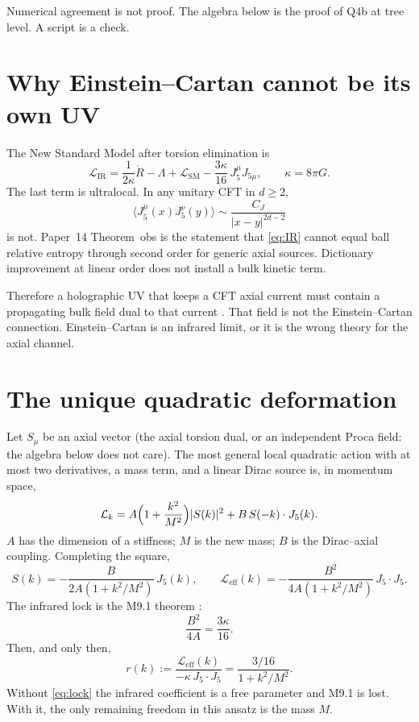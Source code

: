 \documentclass[11pt]{article}
\theoremstyle{definition}
\begin{document}
Numerical agreement is not proof. The algebra below is the proof
of Q4b at tree level. A script is a check.

\section{Why Einstein--Cartan cannot be its own UV}

The New Standard Model after torsion elimination is
\cite{HehlDatta1971,McGwierIII}
\begin{equation}
\mathcal{L}_{\mathrm{IR}}
=
\frac{1}{2\kappa}\mathring{R}
-\Lambda
+\mathcal{L}_{\mathrm{SM}}
-\frac{3\kappa}{16}\,J_5^\mu J_{5\mu},
\qquad
\kappa=8\pi G.
\label{eq:IR}
\end{equation}
The last term is ultralocal. In any unitary CFT in $d\ge 2$,
\begin{equation}
\langle J_5^\mu(x)J_5^\nu(y)\rangle
\sim
\frac{C_J}{\lvert x-y\rvert^{2d-2}}
\label{eq:JJ}
\end{equation}
is not. Paper~14 Theorem~obs is the statement that
\eqref{eq:IR} cannot equal ball relative entropy through second
order for generic axial sources. Dictionary improvement at linear
order \cite{McGwierVI} does not install a bulk kinetic term.

Therefore a holographic UV that keeps a CFT axial current must
contain a propagating bulk field dual to that current
\cite{Witten1998}. That field is not the Einstein--Cartan
connection. Einstein--Cartan is an infrared limit, or it is the
wrong theory for the axial channel.

\section{The unique quadratic deformation}

Let $S_\mu$ be an axial vector (the axial torsion dual, or an
independent Proca field: the algebra below does not care). The
most general local quadratic action with at most two derivatives,
a mass term, and a linear Dirac source is, in momentum space,
\begin{equation}
\mathcal{L}_k
=
A\Bigl(1+\frac{k^2}{M^2}\Bigr)\lvert S(k)\rvert^2
+
B\,S(-k)\cdot J_5(k).
\label{eq:UV}
\end{equation}
$A$ has the dimension of a stiffness; $M$ is the new mass;
$B$ is the Dirac--axial coupling. Completing the square,
\begin{equation}
S(k)
=
-\frac{B}{2A(1+k^2/M^2)}\,J_5(k),
\qquad
\mathcal{L}_{\mathrm{eff}}(k)
=
-\frac{B^2}{4A(1+k^2/M^2)}\,J_5\cdot J_5.
\label{eq:on}
\end{equation}
The infrared lock is the M9.1 theorem
\cite{HehlDatta1971}:
\begin{equation}
\frac{B^2}{4A}=\frac{3\kappa}{16}.
\label{eq:lock}
\end{equation}
Then, and only then,
\begin{equation}
r(k)
:=
\frac{\mathcal{L}_{\mathrm{eff}}(k)}{-\kappa\,J_5\cdot J_5}
=
\frac{3/16}{1+k^2/M^2}.
\label{eq:r}
\end{equation}
Without \eqref{eq:lock} the infrared coefficient is a free
parameter and M9.1 is lost. With it, the only remaining freedom
in this ansatz is the mass $M$.
\end{document}
